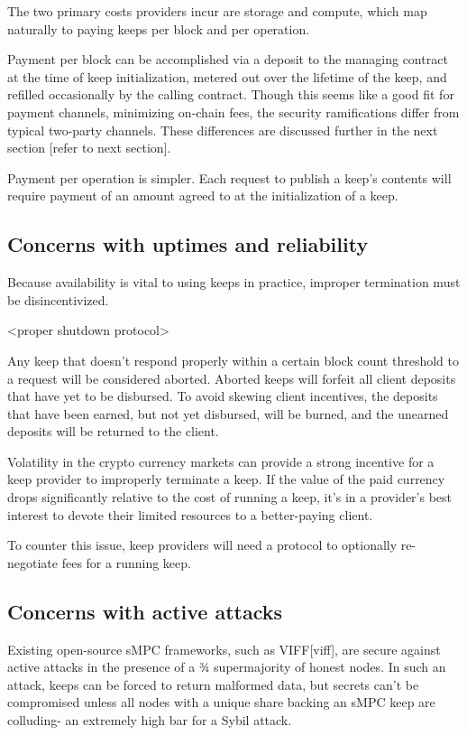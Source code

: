 \documentclass[11pt]{article}
\begin{document}
The two primary costs providers incur are storage and compute, which
map naturally to paying keeps per block and per operation.

Payment per block can be accomplished via a deposit to the managing
contract at the time of keep initialization, metered out over the
lifetime of the keep, and refilled occasionally by the calling
contract. Though this seems like a good fit for payment channels,
minimizing on-chain fees, the security ramifications differ from
typical two-party channels. These differences are discussed further in
the next section [refer to next section].

Payment per operation is simpler. Each request to publish a keep’s
contents will require payment of an amount agreed to at the
initialization of a keep.

\subsection{Concerns with uptimes and reliability}

Because availability is vital to using keeps in practice, improper
termination must be disincentivized.

<proper shutdown protocol>

Any keep that doesn’t respond properly within a certain block count
threshold to a request will be considered aborted. Aborted keeps will
forfeit all client deposits that have yet to be disbursed. To avoid
skewing client incentives, the deposits that have been earned, but not
yet disbursed, will be burned, and the unearned deposits will be
returned to the client.

Volatility in the crypto currency markets can provide a strong
incentive for a keep provider to improperly terminate a keep. If the
value of the paid currency drops significantly relative to the cost of
running a keep, it’s in a provider’s best interest to devote their
limited resources to a better-paying client.

To counter this issue, keep providers will need a protocol to
optionally re-negotiate fees for a running keep.

\subsection{Concerns with active attacks}

Existing open-source sMPC frameworks, such as VIFF[viff], are secure
against active attacks in the presence of a ¾ supermajority of honest
nodes. In such an attack, keeps can be forced to return malformed
data, but secrets can’t be compromised unless all nodes with a unique
share backing an sMPC keep are colluding- an extremely high bar for a
Sybil attack.
\end{document}
